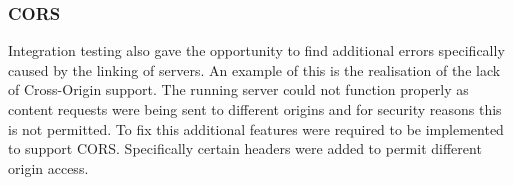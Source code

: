 \subsubsection{CORS}
Integration testing also gave the opportunity to find additional errors specifically caused by the linking of servers. An example of this is the realisation of the lack of Cross-Origin support. The running server could not function properly as content requests were being sent to different origins and for security reasons this is not permitted. To fix this additional features were required to be implemented to support CORS. Specifically certain headers were added to permit different origin access.
